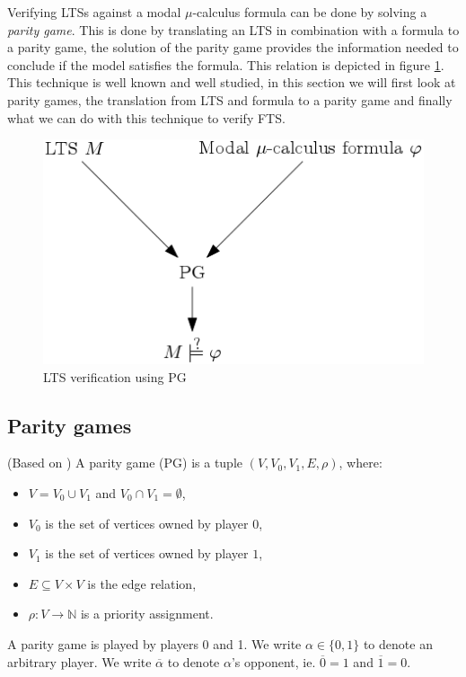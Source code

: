 Verifying LTSs against a modal $\mu$-calculus formula can be done by solving a \textit{parity game}. This is done by translating an LTS in combination with a formula to a parity game, the solution of the parity game provides the information needed to conclude if the model satisfies the formula. This relation is depicted in figure \ref{fig:ltsverificationusingpg}. This technique is well known and well studied, in this section we will first look at parity games, the translation from LTS and formula to a parity game and finally what we can do with this technique to verify FTS.
\begin{figure}[h]
	\centering
	\includegraphics[scale=0.5]{Diagrams/LTSVerificationUsingPG}
	\caption[LTS verification using PG]{LTS verification using PG}
	\label{fig:ltsverificationusingpg}
\end{figure}


\subsection{Parity games}
\begin{definition}
	\label{def_PG}(Based on \cite{Bradfield2018})
	A parity game (PG) is a tuple $(V, V_0, V_1, E, \rho)$, where:
	\begin{itemize}
		\item $V = V_0 \cup V_1$ and $V_0 \cap V_1 = \emptyset$,
		\item $V_0$ is the set of vertices owned by player $0$,
		\item $V_1$ is the set of vertices owned by player $1$, 
		\item $E \subseteq V \times V$ is the edge relation,
		\item $\rho :  V \rightarrow \mathbb{N}$ is a priority assignment.
	\end{itemize}
\end{definition}
A parity game is played by players 0 and 1. We write $\alpha \in \{0,1\}$ to denote an arbitrary player. We write $\overline{\alpha}$ to denote $\alpha$'s opponent, ie. $\overline{0} = 1$ and $\overline{1} = 0$.


